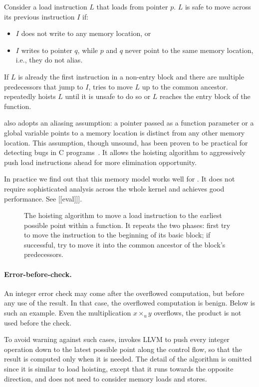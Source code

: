 Consider a load instruction $L$ that loads from pointer $p$.  $L$ is
safe to move across its previous instruction $I$ if:
\begin{itemize}
\item $I$ does not write to any memory location, or
\item $I$ writes to pointer $q$, while $p$ and $q$ never point to the
same memory location, i.e., they do not alias.
\end{itemize}

If $L$ is already the first instruction in a non-entry block and
there are multiple predecessors that jump to $I$, \sys tries to
move $L$ up to the common ancestor.  \sys repeatedly hoists $L$
until it is unsafe to do so or $L$ reaches the entry block of the
function.

\sys also adopts an aliasing assumption: a pointer passed as a
function parameter or a global variable points to a memory location
is distinct from any other memory location.  This assumption, though
unsound, has been proven to be practical for detecting bugs in C
programs~\cite{livshits:ipssa}.  It allows the hoisting algorithm
to aggressively push load instructions ahead for more elimination
opportunity.

In practice we find out that this memory model works well for \sys.
It does not require sophisticated analysis across the whole kernel
and achieves good performance.  See [[eval]]].

\begin{figure}

\caption{The hoisting algorithm to move a load instruction to the
earliest possible point within a function.  It repeats the two
phases: first try to move the instruction to the beginning of its
basic block; if successful, try to move it into the common ancestor
of the block's predecessors.}
\label{f:hoist}
\end{figure}
\fi

\paragraph{Error-before-check.}
An integer error check may come after the overflowed computation,
but before any use of the result.  In that case, the overflowed
computation is benign.  Below is such an example.  Even the
multiplication $x \times_u y$ overflows, the product  is
not used before the check.


To avoid warning against such cases, \sys invokes LLVM to push every
integer operation down to the latest possible point along the control
flow, so that the result is computed only when it is needed.  The
detail of the algorithm is omitted since it is similar to load
hoisting, except that it runs towards the opposite direction, and
does not need to consider memory loads and stores.

